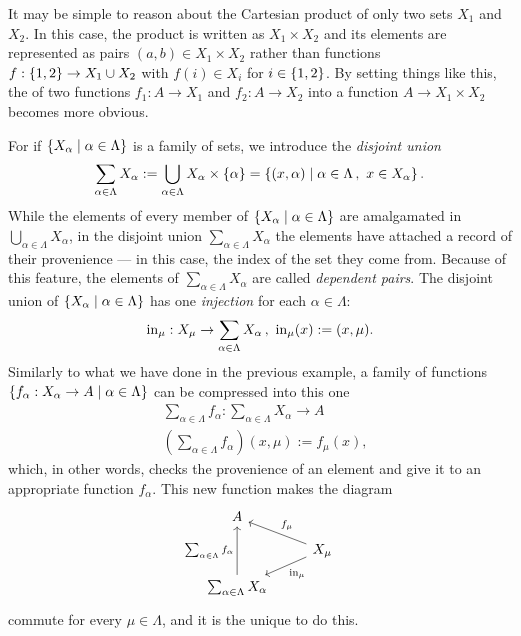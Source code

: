 \begin{exercise}
  It may be simple to reason about the Cartesian product of only two
  sets \(X_1\) and \(X_2\). In this case, the product is written as
  \(X_1 \times X_2\) and its elements are represented as pairs
  \((a, b) \in X_1 \times X_2\) rather than functions
  \(f : \left\{1, 2\right\} \to X_1 \cup X_2\) with \(f(i) \in X_i\) for
  \(i \in \left\{1, 2\right\}\). By setting things like this, the 
  of two functions \(f_1 : A \to X_1\) and \(f_2 : A \to X_2\) into a
  function \(A \to X_1 \times X_2\) becomes more obvious.
\end{exercise}

\begin{example}\label{example:CoprodOfSets}
  For if \(\left\{X_\alpha \mid \alpha \in \Lambda\right\}\) is a family of sets, we introduce the
  {\em disjoint union}
  \[\sum_{\alpha \in \Lambda} X_\alpha := \bigcup_{\alpha \in \Lambda} X_\alpha \times \left\{\alpha\right\} = \left\{(x, \alpha) \mid \alpha \in \Lambda\,,
      \ x \in X_\alpha\right\} .\] While the elements of every member of
  \(\left\{X_\alpha \mid \alpha \in \Lambda\right\}\) are amalgamated in
  \(\bigcup_{\alpha \in \Lambda} X_\alpha\), in the disjoint union
  \(\sum_{\alpha \in \Lambda} X_\alpha\) the elements have attached a record of their
  provenience --- in this case, the index of the set they come
  from. Because of this feature, the elements of
  \(\sum_{\alpha \in \Lambda} X_\alpha\) are called {\em dependent pairs}. The disjoint union
  of \(\left\{X_\alpha \mid \alpha \in \Lambda\right\}\) has one {\em injection} for each \(\alpha \in \Lambda\):
  \[\operatorname{in}_\mu : X_\mu \to \sum_{\alpha \in \Lambda} X_\alpha\,, \ \operatorname{in}_\mu(x) := (x, \mu) .\]
  Similarly to what we have done in the previous example, a family of
  functions \(\left\{f_\alpha : X_\alpha \to A \mid \alpha \in \Lambda\right\}\) can be compressed into this
  one
  \begin{align*}
    & \sum_{\alpha \in \Lambda} f_\alpha : \sum_{\alpha \in \Lambda} X_\alpha \to A \\
    & \left(\sum_{\alpha \in \Lambda} f_\alpha\right) (x, \mu) := f_\mu(x) ,
  \end{align*}
  which, in other words, checks the provenience of an element and give
  it to an appropriate function \(f_\alpha\). This new function makes the
  diagram
  \[\begin{tikzcd}[row sep=small]
      A \\
      & X_\mu \ar["{\inj_\mu}", dl] \ar["{f_\mu}", ul, swap] \\
      \sum_{\alpha \in \Lambda} X_\alpha \ar["{\sum_{\alpha \in \Lambda} f_\alpha}", uu]
    \end{tikzcd}\] commute for every \(\mu \in \Lambda\), and it is the unique to
  do this.%
\end{example}

